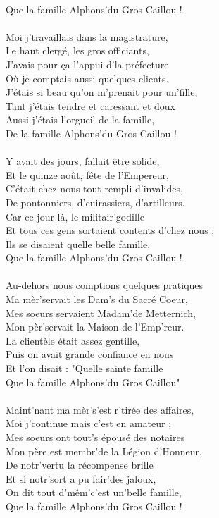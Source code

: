 \\Que la famille Alphons'du Gros Caillou !
\breakpage
\\\\Moi j'travaillais dans la magistrature,
\\Le haut clergé, les gros officiants,
\\J'avais pour ça l'appui d'la préfecture
\\Où je comptais aussi quelques clients.
\\J'étais si beau qu'on m'prenait pour un'fille,
\\Tant j'étais tendre et caressant et doux
\\Aussi j'étais l'orgueil de la famille,
\\De la famille Alphons'du Gros Caillou !
\\\\Y avait des jours, fallait être solide,
\\Et le quinze août, fête de l'Empereur,
\\C'était chez nous tout rempli d'invalides,
\\De pontonniers, d'cuirassiers, d'artilleurs.
\\Car ce jour-là, le militair'godille
\\Et tous ces gens sortaient contents d'chez nous ;
\\Ils se disaient quelle belle famille,
\\Que la famille Alphons'du Gros Caillou !
\\\\Au-dehors nous comptions quelques pratiques
\\Ma mèr'servait les Dam's du Sacré Coeur,
\\Mes soeurs servaient Madam'de Metternich,
\\Mon pèr'servait la Maison de l'Emp'reur.
\\La clientèle était assez gentille,
\\Puis on avait grande confiance en nous
\\Et l'on disait : "Quelle sainte famille
\\Que la famille Alphons'du Gros Caillou"
\\\\Maint'nant ma mèr's'est r'tirée des affaires,
\\Moi j'continue mais c'est en amateur ;
\\Mes soeurs ont tout's épousé des notaires
\\Mon père est membr'de la Légion d'Honneur,
\\De notr'vertu la récompense brille
\\Et si notr'sort a pu fair'des jaloux,
\\On dit tout d'mêm'c'est un'belle famille,
\\Que la famille Alphons'du Gros Caillou !
\breakpage